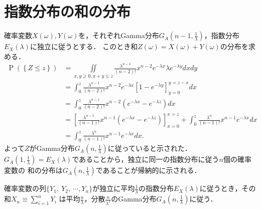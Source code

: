 \documentclass[a4j,papersize,disablejfam,slide,14pt]{jsarticle}
\def\exp#1{e^{#1}} %
\def\prob#1{\operatorname{P} \left(\left\{ #1 \right\}\right)} %
\begin{document}
\section{指数分布の和の分布}
\label{sec:appendix_gamma}
	確率変数$X(\omega),Y(\omega)$を，それぞれ{\rm Gamma}分布$G_A(n-1, \frac{1}{\lambda})$，指数分布$E_X(\lambda)$に独立に従うとする．
    このとき和$Z(\omega) = X(\omega) + Y(\omega)$の分布を求める．
    \begin{align}
    	\prob{Z \leq z} &= \underset{x,y \geq 0, x + y \leq z}{\iint} \frac{\lambda^{n-1}}{(n-2)!}x^{n-2}\exp{-\lambda x} \lambda \exp{-\lambda y} dxdy \\
        &= \int_{0}^{z} \frac{\lambda^{n-1}}{(n-2)!}x^{n-2}\exp{-\lambda x} \left[ 1 - \exp{-\lambda y} \right]_{y=0}^{y = z - x} dx \\
        &= \int_{0}^{z} \frac{\lambda^{n-1}}{(n-2)!}x^{n-2}(\exp{-\lambda x} - \exp{-\lambda z}) dx \\
        &= \left[ \frac{\lambda^{n-1}}{(n-1)!}x^{n-1}(\exp{-\lambda x} - \exp{-\lambda z}) \right]_{x=0}^{x=z} + \int_{0}^{z} \frac{\lambda^n}{(n-1)!}x^{n-1}\exp{-\lambda x} dx \\
        &= \int_{0}^{z} \frac{\lambda^n}{(n-1)!}x^{n-1}\exp{-\lambda x} dx.
    \end{align}
    よって$Z$が{\rm Gamma}分布$G_A(n, \frac{1}{\lambda})$に従っていると示された．$G_A(1, \frac{1}{\lambda}) = E_X(\lambda)$であることから，独立に同一の指数分布に従う$n$個の確率変数の
    和の分布は$G_A(n, \frac{1}{\lambda})$であることが帰納的に示される．
    \begin{screen}
    	確率変数の列$\{Y_1,\ Y_2,\ \cdots, Y_n \}$が独立に平均$\frac{1}{\lambda}$の指数分布$E_X(\lambda)$に従うとき，その和$X_n \equiv \sum\limits_{i=1}^{n} Y_i$
        は平均$\frac{n}{\lambda}$，分散$\frac{n}{\lambda^2}$の{\rm Gamma}分布$G_A(n, \frac{1}{\lambda})$に従う．
    \end{screen}
\end{document}
